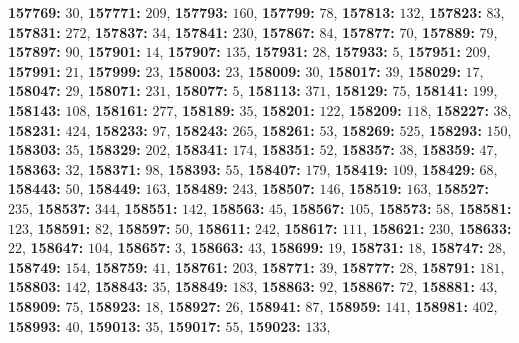 \textsf{\bfseries 157769:} $30$, \textsf{\bfseries 157771:} $209$, \textsf{\bfseries 157793:} $160$, \textsf{\bfseries 157799:} $78$, \textsf{\bfseries 157813:} $132$, \textsf{\bfseries 157823:} $83$, \textsf{\bfseries 157831:} $272$, \textsf{\bfseries 157837:} $34$, \textsf{\bfseries 157841:} $230$, \textsf{\bfseries 157867:} $84$, \textsf{\bfseries 157877:} $70$, \textsf{\bfseries 157889:} $79$, \textsf{\bfseries 157897:} $90$, \textsf{\bfseries 157901:} $14$, \textsf{\bfseries 157907:} $135$, \textsf{\bfseries 157931:} $28$, \textsf{\bfseries 157933:} $5$, \textsf{\bfseries 157951:} $209$, \textsf{\bfseries 157991:} $21$, \textsf{\bfseries 157999:} $23$, \textsf{\bfseries 158003:} $23$, \textsf{\bfseries 158009:} $30$, \textsf{\bfseries 158017:} $39$, \textsf{\bfseries 158029:} $17$, \textsf{\bfseries 158047:} $29$, \textsf{\bfseries 158071:} $231$, \textsf{\bfseries 158077:} $5$, \textsf{\bfseries 158113:} $371$, \textsf{\bfseries 158129:} $75$, \textsf{\bfseries 158141:} $199$, \textsf{\bfseries 158143:} $108$, \textsf{\bfseries 158161:} $277$, \textsf{\bfseries 158189:} $35$, \textsf{\bfseries 158201:} $122$, \textsf{\bfseries 158209:} $118$, \textsf{\bfseries 158227:} $38$, \textsf{\bfseries 158231:} $424$, \textsf{\bfseries 158233:} $97$, \textsf{\bfseries 158243:} $265$, \textsf{\bfseries 158261:} $53$, \textsf{\bfseries 158269:} $525$, \textsf{\bfseries 158293:} $150$, \textsf{\bfseries 158303:} $35$, \textsf{\bfseries 158329:} $202$, \textsf{\bfseries 158341:} $174$, \textsf{\bfseries 158351:} $52$, \textsf{\bfseries 158357:} $38$, \textsf{\bfseries 158359:} $47$, \textsf{\bfseries 158363:} $32$, \textsf{\bfseries 158371:} $98$, \textsf{\bfseries 158393:} $55$, \textsf{\bfseries 158407:} $179$, \textsf{\bfseries 158419:} $109$, \textsf{\bfseries 158429:} $68$, \textsf{\bfseries 158443:} $50$, \textsf{\bfseries 158449:} $163$, \textsf{\bfseries 158489:} $243$, \textsf{\bfseries 158507:} $146$, \textsf{\bfseries 158519:} $163$, \textsf{\bfseries 158527:} $235$, \textsf{\bfseries 158537:} $344$, \textsf{\bfseries 158551:} $142$, \textsf{\bfseries 158563:} $45$, \textsf{\bfseries 158567:} $105$, \textsf{\bfseries 158573:} $58$, \textsf{\bfseries 158581:} $123$, \textsf{\bfseries 158591:} $82$, \textsf{\bfseries 158597:} $50$, \textsf{\bfseries 158611:} $242$, \textsf{\bfseries 158617:} $111$, \textsf{\bfseries 158621:} $230$, \textsf{\bfseries 158633:} $22$, \textsf{\bfseries 158647:} $104$, \textsf{\bfseries 158657:} $3$, \textsf{\bfseries 158663:} $43$, \textsf{\bfseries 158699:} $19$, \textsf{\bfseries 158731:} $18$, \textsf{\bfseries 158747:} $28$, \textsf{\bfseries 158749:} $154$, \textsf{\bfseries 158759:} $41$, \textsf{\bfseries 158761:} $203$, \textsf{\bfseries 158771:} $39$, \textsf{\bfseries 158777:} $28$, \textsf{\bfseries 158791:} $181$, \textsf{\bfseries 158803:} $142$, \textsf{\bfseries 158843:} $35$, \textsf{\bfseries 158849:} $183$, \textsf{\bfseries 158863:} $92$, \textsf{\bfseries 158867:} $72$, \textsf{\bfseries 158881:} $43$, \textsf{\bfseries 158909:} $75$, \textsf{\bfseries 158923:} $18$, \textsf{\bfseries 158927:} $26$, \textsf{\bfseries 158941:} $87$, \textsf{\bfseries 158959:} $141$, \textsf{\bfseries 158981:} $402$, \textsf{\bfseries 158993:} $40$, \textsf{\bfseries 159013:} $35$, \textsf{\bfseries 159017:} $55$, \textsf{\bfseries 159023:} $133$, 
